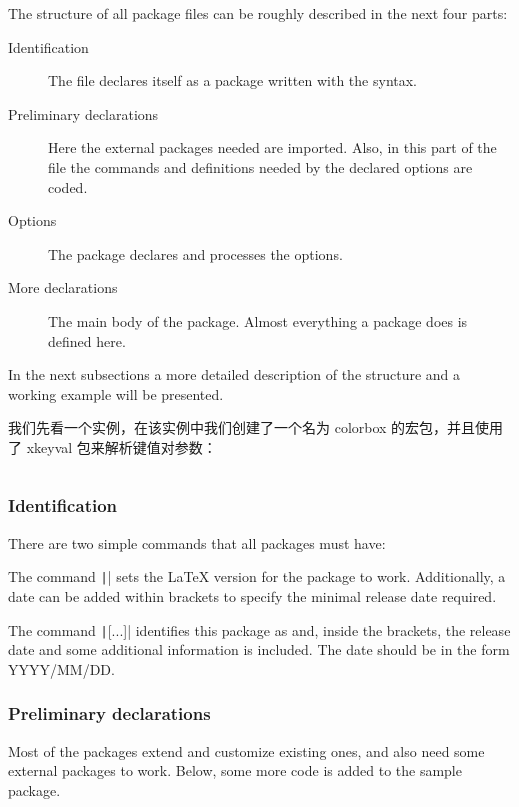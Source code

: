 The structure of all package files can be roughly described in the next four parts:

\begin{description}
  \item[Identification] The file declares itself as a package written with the {\LaTeXe} syntax.
  \item[Preliminary declarations] Here the external packages needed are imported. Also, in this part of the file the commands and definitions needed by the declared options are coded.
  \item[Options] The package declares and processes the options.
  \item[More declarations] The main body of the package. Almost everything a package does is defined here.
\end{description}

In the next subsections a more detailed description of the structure and a working example will be presented.

我们先看一个实例，在该实例中我们创建了一个名为 colorbox 的宏包，并且使用了 xkeyval 包来解析键值对参数：

\inputminted{latex}{examples/programming/create-packages.tex}

\subsubsection{Identification}

There are two simple commands that all packages must have:

The command \texttt|| sets the {\LaTeX} version for the package to work. 
Additionally, a date can be added within brackets to specify the minimal release date required.

The command \texttt|[...]| identifies this package as 
 and, inside the brackets, the release date and some additional information 
is included. The date should be in the form YYYY/MM/DD.

\subsubsection{Preliminary declarations}

Most of the packages extend and customize existing ones, 
and also need some external packages to work. Below, 
some more code is added to the sample package.

